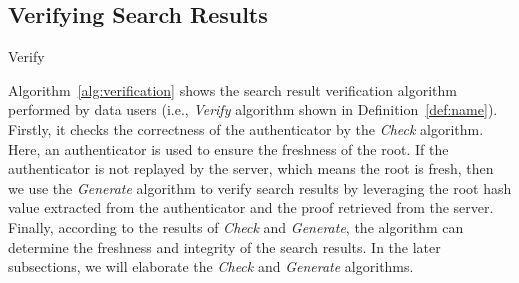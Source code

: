 \subsection{Verifying Search Results}
\begin{algorithm}[t]
  \caption{Verify}
  \label{alg:verification}
  \begin{algorithmic}[1]

  \end{algorithmic}
\end{algorithm}
Algorithm~\ref{alg:verification} shows the search result verification algorithm performed by data users (i.e., {\it Verify} algorithm shown in Definition~\ref{def:name}). Firstly, it checks the correctness of the authenticator by the {\it Check} algorithm.
Here, an authenticator is used to ensure the freshness of the root. %
If the authenticator is not replayed by the server, which means the root is fresh, then we use the {\it Generate} algorithm to verify search results by leveraging the root hash value extracted from the authenticator and the proof retrieved from the server. Finally, according to the results of {\it Check} and {\it Generate}, the algorithm can determine the freshness and integrity of the search results. In the later subsections, we will elaborate the {\it Check} and {\it Generate} algorithms.




